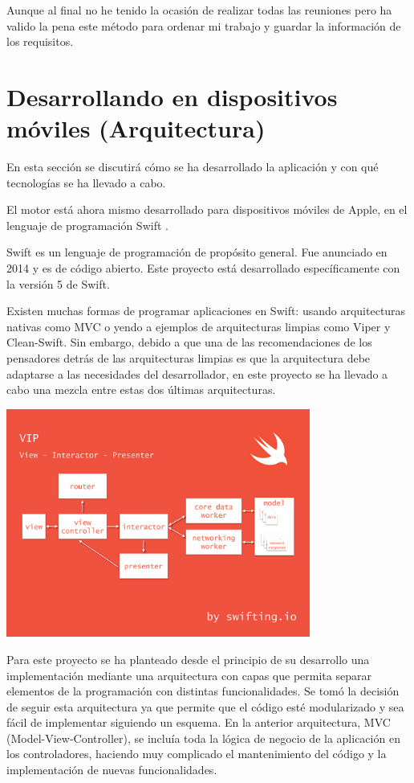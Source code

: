 Aunque al final no he tenido la ocasión de realizar todas las reuniones pero ha valido la pena este método para ordenar mi trabajo y guardar la información de los requisitos.

\section{Desarrollando en dispositivos móviles (Arquitectura)}
En esta sección se discutirá cómo se ha desarrollado la aplicación y con qué tecnologías se ha llevado a cabo.

El motor está ahora mismo desarrollado para dispositivos móviles de Apple, en el lenguaje de programación Swift \cite{swiftGuides}.

Swift es un lenguaje de programación de propósito general. Fue anunciado en 2014 y es de código abierto. Este proyecto está desarrollado específicamente con la versión 5 de Swift.

Existen muchas formas de programar aplicaciones en Swift: usando arquitecturas nativas como MVC o yendo a ejemplos de arquitecturas limpias como Viper y Clean-Swift.
Sin embargo, debido a que una de las recomendaciones de los pensadores detrás de las arquitecturas limpias es que la arquitectura debe adaptarse a las necesidades del desarrollador, en este proyecto se ha llevado a cabo una mezcla entre estas dos últimas arquitecturas.

\begin{center}
	\includegraphics[width=0.75\textwidth]{include/cleanSwiftArchitecture.png}
\end{center}

Para este proyecto se ha planteado desde el principio de su desarrollo una implementación mediante una arquitectura con capas que permita separar elementos de la programación con distintas funcionalidades. Se tomó la decisión de seguir esta arquitectura ya que permite que el código esté modularizado y sea fácil de implementar siguiendo un esquema. En la anterior arquitectura, MVC (Model-View-Controller), se incluía toda la lógica de negocio de la aplicación en los controladores, haciendo muy complicado el mantenimiento del código y la implementación de nuevas funcionalidades.

